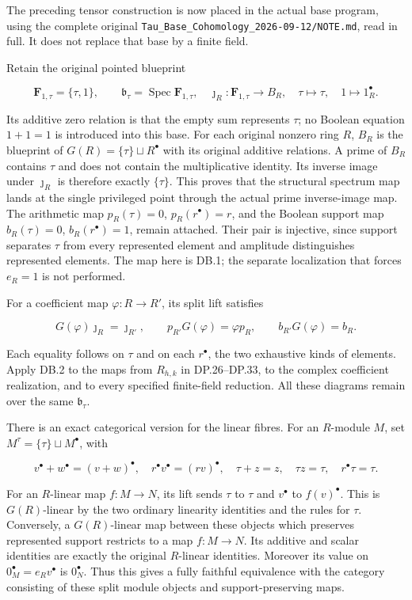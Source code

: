 The preceding tensor construction is now placed in the actual base program, using the complete original \nolinkurl{Tau_Base_Cohomology_2026-09-12/NOTE.md}, read in full. It does not replace that base by a finite field.

Retain the original pointed blueprint

\[
\mathbf F_{1,\tau}=\{\tau,1\},\qquad
\mathfrak b_\tau=\operatorname{Spec}\mathbf F_{1,\tau},
\quad \jmath_R:\mathbf F_{1,\tau}\to B_R,
\quad \tau\mapsto\tau,\quad1\mapsto1_R^\bullet.
\tag{DB.1}
\]

Its additive zero relation is that the empty sum represents \(\tau\); no Boolean equation \(1+1=1\) is introduced into this base. For each original nonzero ring \(R\), \(B_R\) is the blueprint of \(G(R)=\{\tau\}\sqcup R^\bullet\) with its original additive relations. A prime of \(B_R\) contains \(\tau\) and does not contain the multiplicative identity. Its inverse image under \(\jmath_R\) is therefore exactly \(\{\tau\}\). This proves that the structural spectrum map lands at the single privileged point through the actual prime inverse-image map. The arithmetic map \(p_R(\tau)=0\), \(p_R(r^\bullet)=r\), and the Boolean support map \(b_R(\tau)=0\), \(b_R(r^\bullet)=1\), remain attached. Their pair is injective, since support separates \(\tau\) from every represented element and amplitude distinguishes represented elements. The map here is DB.1; the separate localization that forces \(e_R=1\) is not performed.

For a coefficient map \(\varphi:R\to R'\), its split lift satisfies

\[
G(\varphi)\jmath_R=\jmath_{R'},\qquad
p_{R'}G(\varphi)=\varphi p_R,\qquad
b_{R'}G(\varphi)=b_R.
\tag{DB.2}
\]

Each equality follows on \(\tau\) and on each \(r^\bullet\), the two exhaustive kinds of elements. Apply DB.2 to the maps from \(R_{h,k}\) in DP.26--DP.33, to the complex coefficient realization, and to every specified finite-field reduction. All these diagrams remain over the same \(\mathfrak b_\tau\).

There is an exact categorical version for the linear fibres. For an \(R\)-module \(M\), set \(M^\tau=\{\tau\}\sqcup M^\bullet\), with

\[
v^\bullet+w^\bullet=(v+w)^\bullet,\quad
r^\bullet v^\bullet=(rv)^\bullet,
\quad \tau+z=z,
\quad \tau z=\tau,
\quad r^\bullet\tau=\tau.
\tag{DB.3}
\]

For an \(R\)-linear map \(f:M\to N\), its lift sends \(\tau\) to \(\tau\) and \(v^\bullet\) to \(f(v)^\bullet\). This is \(G(R)\)-linear by the two ordinary linearity identities and the rules for \(\tau\). Conversely, a \(G(R)\)-linear map between these objects which preserves represented support restricts to a map \(f:M\to N\). Its additive and scalar identities are exactly the original \(R\)-linear identities. Moreover its value on \(0_M^\bullet=e_Rv^\bullet\) is \(0_N^\bullet\). Thus this gives a fully faithful equivalence with the category consisting of these split module objects and support-preserving maps.

